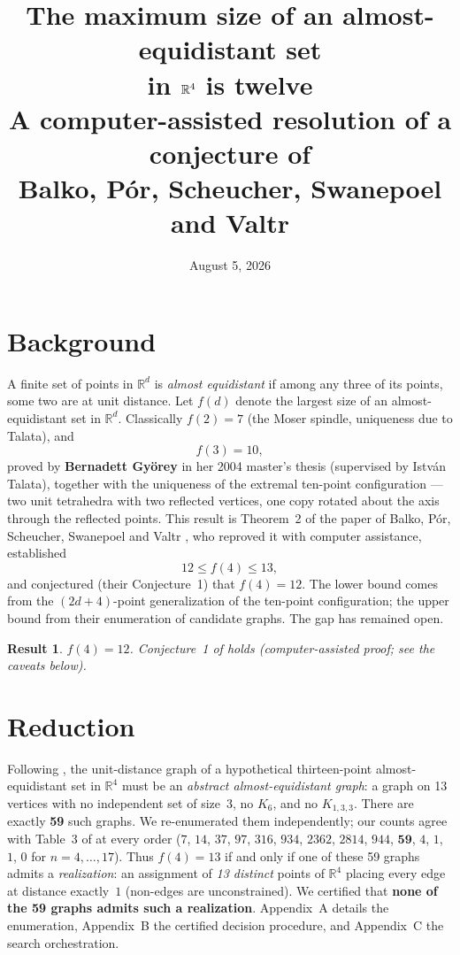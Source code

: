 \documentclass[11pt]{article}
\title{\vspace{-1.2cm}The maximum size of an almost-equidistant set\\ in $\R^4$ is twelve\\[4pt]
\large A computer-assisted resolution of a conjecture of\\ Balko, P\'or, Scheucher, Swanepoel and Valtr}
\author{}
\date{August 5, 2026}
\newtheorem*{result}{Result}
\newcommand{\R}{\mathbb{R}}
\begin{document}
\maketitle
\vspace{-1.4cm}

\section*{Background}

A finite set of points in $\R^d$ is \emph{almost equidistant} if among any
three of its points, some two are at unit distance. Let $f(d)$ denote the
largest size of an almost-equidistant set in $\R^d$. Classically $f(2)=7$
(the Moser spindle, uniqueness due to Talata), and
\[
  f(3)=10,
\]
proved by \textbf{Bernadett Gy\"orey} in her 2004 master's thesis
\cite{Gyorey} (supervised by Istv\'an Talata), together with the uniqueness of
the extremal ten-point configuration --- two unit tetrahedra with two reflected
vertices, one copy rotated about the axis through the reflected points. This
result is Theorem~2 of the paper of Balko, P\'or, Scheucher, Swanepoel and
Valtr \cite{BPSSV}, who reproved it with computer assistance, established
\[
  12 \le f(4) \le 13,
\]
and conjectured (their Conjecture~1) that $f(4)=12$. The lower bound comes from
the $(2d{+}4)$-point generalization of the ten-point configuration; the upper
bound from their enumeration of candidate graphs. The gap has remained open.

\begin{result}
$f(4) = 12$. Conjecture~1 of \cite{BPSSV} holds
(computer-assisted proof; see the caveats below).
\end{result}

\section*{Reduction}

Following \cite{BPSSV}, the unit-distance graph of a hypothetical
thirteen-point almost-equidistant set in $\R^4$ must be an \emph{abstract
almost-equidistant graph}: a graph on 13 vertices with no independent set of
size~3, no $K_6$, and no $K_{1,3,3}$. There are exactly \textbf{59} such
graphs. We re-enumerated them independently; our counts agree with Table~3 of
\cite{BPSSV} at every order ($7$, $14$, $37$, $97$, $316$, $934$, $2362$,
$2814$, $944$, $\mathbf{59}$, $4$, $1$, $1$, $0$ for $n=4,\dots,17$). Thus
$f(4)=13$ if and only if one of these 59 graphs admits a \emph{realization}: an
assignment of \emph{13 distinct} points of $\R^4$ placing every edge at
distance exactly~$1$ (non-edges are unconstrained). We certified that
\textbf{none of the 59 graphs admits such a realization}. Appendix~A details
the enumeration, Appendix~B the certified decision procedure, and Appendix~C
the search orchestration.
\end{document}
